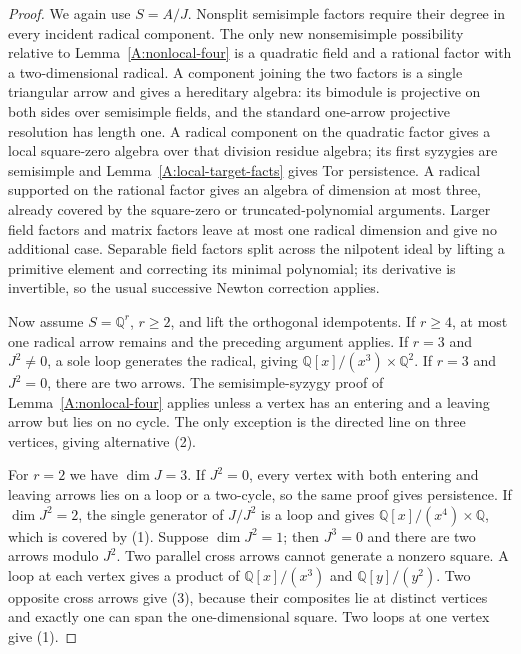 \begin{proof}
We again use $S=A/J$. Nonsplit semisimple factors require
their degree in every incident radical component. The only
new nonsemisimple possibility relative to
Lemma~\ref{A:nonlocal-four} is a quadratic field and a
rational factor with a two-dimensional radical. A component
joining the two factors is a single triangular arrow and
gives a hereditary algebra: its bimodule is projective on
both sides over semisimple fields, and the standard
one-arrow projective resolution has length one.
A radical component on the quadratic factor gives a local
square-zero algebra over that division residue algebra;
its first syzygies are semisimple and
Lemma~\ref{A:local-target-facts} gives Tor persistence.
A radical supported on the rational factor gives an algebra
of dimension at most three, already covered by the
square-zero or truncated-polynomial arguments. Larger field
factors and matrix factors leave at most one radical
dimension and give no additional case. Separable field
factors split across the nilpotent ideal by lifting a
primitive element and correcting its minimal polynomial;
its derivative is invertible, so the usual successive
Newton correction applies.

Now assume $S=\mathbb Q^r$, $r\geq2$, and lift the
orthogonal idempotents. If $r\geq4$, at most one radical
arrow remains and the preceding argument applies. If
$r=3$ and $J^2\ne0$, a sole loop generates the radical,
giving $\mathbb Q[x]/(x^3)\times\mathbb Q^2$.
If $r=3$ and $J^2=0$, there are two arrows. The
semisimple-syzygy proof of Lemma~\ref{A:nonlocal-four}
applies unless a vertex has an entering and a leaving
arrow but lies on no cycle. The only exception is the
directed line on three vertices, giving alternative (2).

For $r=2$ we have $\dim J=3$. If $J^2=0$, every vertex
with both entering and leaving arrows lies on a loop or
a two-cycle, so the same proof gives persistence.
If $\dim J^2=2$, the single generator of $J/J^2$ is a
loop and gives $\mathbb Q[x]/(x^4)\times\mathbb Q$,
which is covered by (1). Suppose $\dim J^2=1$; then
$J^3=0$ and there are two arrows modulo $J^2$.
Two parallel cross arrows cannot generate a nonzero
square. A loop at each vertex gives a product of
$\mathbb Q[x]/(x^3)$ and $\mathbb Q[y]/(y^2)$.
Two opposite cross arrows give (3), because their
composites lie at distinct vertices and exactly one
can span the one-dimensional square. Two loops at
one vertex give (1).


\end{proof}
